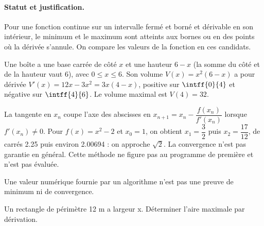 \paragraph{Statut et justification.} Pour une fonction continue sur un intervalle fermé et borné et dérivable en son intérieur, le minimum et le maximum sont atteints aux bornes ou en des points où la dérivée s’annule. On compare les valeurs de la fonction en ces candidats.
\begin{example}Une boîte a une base carrée de côté $x$ et une hauteur $6-x$ (la somme du côté et de la hauteur vaut 6), avec $0\le x\le6$. Son volume $V(x)=x^2(6-x)$ a pour dérivée $V\prime(x)=12x-3x^2=3x(4-x)$, positive sur $\intff{0}{4}$ et négative sur $\intff{4}{6}$. Le volume maximal est $V(4)=32$.\end{example}\label{C06-EX5}
\begin{beyond}La tangente en $x_n$ coupe l’axe des abscisses en $x_{n+1}=x_n-\dfrac{f(x_n)}{f\prime(x_n)}$ lorsque $f\prime(x_n)\ne0$. Pour $f(x)=x^2-2$ et $x_0=1$, on obtient $x_1=\dfrac{3}{2}$ puis $x_2=\dfrac{17}{12}$, de carrés \num{2,25} puis environ \num{2,00694} : on approche $\sqrt2$. La convergence n’est pas garantie en général. Cette méthode ne figure pas au programme de première et n’est pas évaluée.\end{beyond}
\begin{pitfall}Une valeur numérique fournie par un algorithme n’est pas une preuve de minimum ni de convergence.\end{pitfall}
\begin{application}Un rectangle de périmètre 12 m a largeur x. Déterminer l’aire maximale par dérivation.\end{application}\label{C06-AP5}
\mxnewpage

